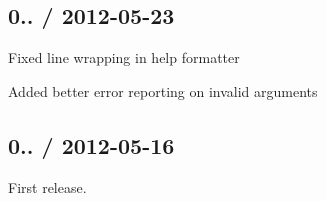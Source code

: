 \subsection*{0.. / 2012-\/05-\/23 }


\begin{DoxyItemize}
\item Fixed line wrapping in help formatter
\item Added better error reporting on invalid arguments
\end{DoxyItemize}

\subsection*{0.. / 2012-\/05-\/16 }


\begin{DoxyItemize}
\item First release. 
\end{DoxyItemize}